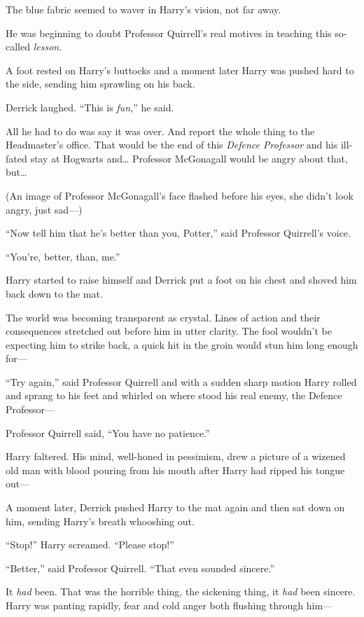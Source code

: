 The blue fabric seemed to waver in Harry's vision, not far away.

He was beginning to doubt Professor Quirrell's real motives in teaching
this so-called \emph{lesson.}

A foot rested on Harry's buttocks and a moment later Harry was pushed
hard to the side, sending him sprawling on his back.

Derrick laughed. ``This is \emph{fun,}'' he said.

All he had to do was say it was over. And report the whole thing to the
Headmaster's office. That would be the end of this \emph{Defence
Professor} and his ill-fated stay at Hogwarts and\ldots{} Professor
McGonagall would be angry about that, but\ldots{}

(An image of Professor McGonagall's face flashed before his eyes, she
didn't look angry, just sad---)

``Now tell him that he's better than you, Potter,'' said Professor
Quirrell's voice.

``You're, better, than, me.''

Harry started to raise himself and Derrick put a foot on his chest and
shoved him back down to the mat.

The world was becoming transparent as crystal. Lines of action and their
consequences stretched out before him in utter clarity. The fool
wouldn't be expecting him to strike back, a quick hit in the groin would
stun him long enough for---

``Try again,'' said Professor Quirrell and with a sudden sharp motion
Harry rolled and sprang to his feet and whirled on where stood his real
enemy, the Defence Professor---

Professor Quirrell said, ``You have no patience.''

Harry faltered. His mind, well-honed in pessimism, drew a picture of a
wizened old man with blood pouring from his mouth after Harry had ripped
his tongue out---

A moment later, Derrick pushed Harry to the mat again and then sat down
on him, sending Harry's breath whooshing out.

``Stop!'' Harry screamed. ``Please stop!''

``Better,'' said Professor Quirrell. ``That even sounded sincere.''

It \emph{had} been. That was the horrible thing, the sickening thing, it
\emph{had} been sincere. Harry was panting rapidly, fear and cold anger
both flushing through him---


